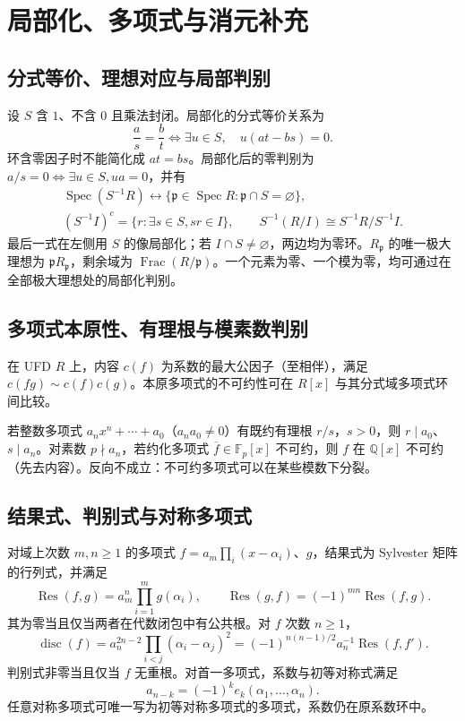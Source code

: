 \documentclass[../main.tex]{subfiles}
\begin{document}
\section{局部化、多项式与消元补充}
\subsection{分式等价、理想对应与局部判别}
设 $S$ 含 $1$、不含 $0$ 且乘法封闭。局部化的分式等价关系为
\[
\frac as=\frac bt\iff\exists u\in S,\quad u(at-bs)=0.
\]
环含零因子时不能简化成 $at=bs$。局部化后的零判别为 $a/s=0\iff\exists u\in S,ua=0$，并有
\begin{gather*}
\operatorname{Spec}(S^{-1}R)\longleftrightarrow
\{\mathfrak p\in\operatorname{Spec}R:\mathfrak p\cap S=\varnothing\},\\
(S^{-1}I)^c=\{r:\exists s\in S,sr\in I\},\qquad
S^{-1}(R/I)\cong S^{-1}R/S^{-1}I.
\end{gather*}
最后一式在左侧用 $S$ 的像局部化；若 $I\cap S\ne\varnothing$，两边均为零环。$R_{\mathfrak p}$ 的唯一极大理想为 $\mathfrak pR_{\mathfrak p}$，剩余域为 $\operatorname{Frac}(R/\mathfrak p)$。一个元素为零、一个模为零，均可通过在全部极大理想处的局部化判别。

\subsection{多项式本原性、有理根与模素数判别}
在 UFD $R$ 上，内容 $c(f)$ 为系数的最大公因子（至相伴），满足 $c(fg)\sim c(f)c(g)$。本原多项式的不可约性可在 $R[x]$ 与其分式域多项式环间比较。

若整数多项式 $a_nx^n+\cdots+a_0$（$a_na_0\ne0$）有既约有理根 $r/s$，$s>0$，则 $r\mid a_0$、$s\mid a_n$。对素数 $p\nmid a_n$，若约化多项式 $\overline f\in\mathbb F_p[x]$ 不可约，则 $f$ 在 $\mathbb Q[x]$ 不可约（先去内容）。反向不成立：不可约多项式可以在某些模数下分裂。

\subsection{结果式、判别式与对称多项式}
对域上次数 $m,n\ge1$ 的多项式 $f=a_m\prod_i(x-\alpha_i)$、$g$，结果式为 Sylvester 矩阵的行列式，并满足
\[
\operatorname{Res}(f,g)=a_m^n\prod_{i=1}^m g(\alpha_i),\qquad
\operatorname{Res}(g,f)=(-1)^{mn}\operatorname{Res}(f,g).
\]
其为零当且仅当两者在代数闭包中有公共根。对 $f$ 次数 $n\ge1$，
\[
\operatorname{disc}(f)=a_n^{2n-2}\prod_{i<j}(\alpha_i-\alpha_j)^2
=(-1)^{n(n-1)/2}a_n^{-1}\operatorname{Res}(f,f').
\]
判别式非零当且仅当 $f$ 无重根。对首一多项式，系数与初等对称式满足
\[
a_{n-k}=(-1)^ke_k(\alpha_1,\ldots,\alpha_n).
\]
任意对称多项式可唯一写为初等对称多项式的多项式，系数仍在原系数环中。
\end{document}

